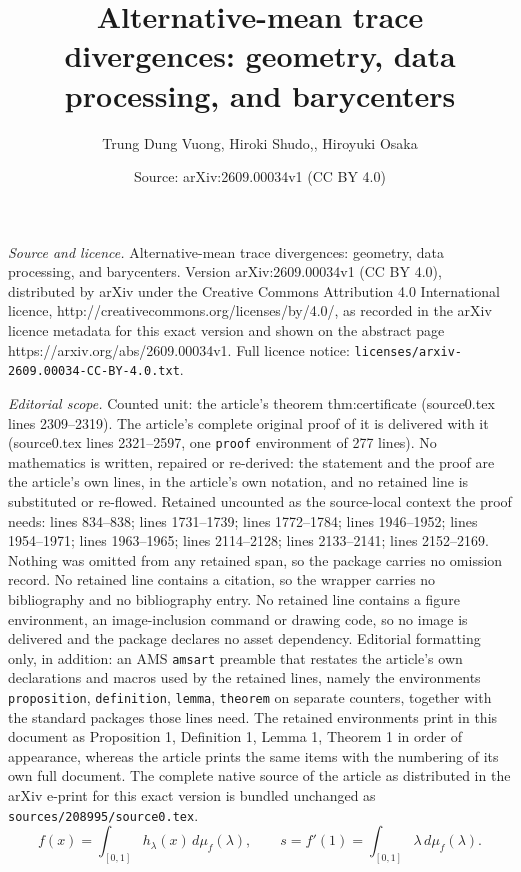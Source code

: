 \documentclass[10pt,a4paper]{amsart}
\title{Alternative-mean trace divergences: geometry, data processing, and barycenters}
\author{Trung Dung Vuong, Hiroki Shudo,, Hiroyuki Osaka}
\date{Source: arXiv:2609.00034v1 (CC BY 4.0)}
\begin{document}
\maketitle

\noindent\emph{Source and licence.} Alternative-mean trace divergences: geometry, data processing, and barycenters. Version arXiv:2609.00034v1 (CC BY 4.0), distributed by arXiv under the Creative Commons Attribution 4.0 International licence, http://creativecommons.org/licenses/by/4.0/, as recorded in the arXiv licence metadata for this exact version and shown on the abstract page https://arxiv.org/abs/2609.00034v1. Full licence notice: \texttt{licenses/arxiv-2609.00034-CC-BY-4.0.txt}.\par\smallskip

\noindent\textit{Editorial scope.} Counted unit: the article's theorem thm:certificate (source0.tex lines 2309--2319). The article's complete original proof of it is delivered with it (source0.tex lines 2321--2597, one \texttt{proof} environment of 277 lines). No mathematics is written, repaired or re-derived: the statement and the proof are the article's own lines, in the article's own notation, and no retained line is substituted or re-flowed.  Retained uncounted as the source-local context the proof needs: lines 834--838; lines 1731--1739; lines 1772--1784; lines 1946--1952; lines 1954--1971; lines 1963--1965; lines 2114--2128; lines 2133--2141; lines 2152--2169.  Nothing was omitted from any retained span, so the package carries no omission record.  No retained line contains a citation, so the wrapper carries no bibliography and no bibliography entry.  No retained line contains a figure environment, an image-inclusion command or drawing code, so no image is delivered and the package declares no asset dependency.  Editorial formatting only, in addition: an AMS \texttt{amsart} preamble that restates the article's own declarations and macros used by the retained lines, namely the environments \texttt{proposition}, \texttt{definition}, \texttt{lemma}, \texttt{theorem} on separate counters, together with the standard packages those lines need.  The retained environments print in this document as Proposition 1, Definition 1, Lemma 1, Theorem 1 in order of appearance, whereas the article prints the same items with the numbering of its own full document.  The complete native source of the article as distributed in the arXiv e-print for this exact version is bundled unchanged as \texttt{sources/208995/source0.tex}.
	\begin{equation}\label{eq:representing-measure}
		f(x)=\int_{[0,1]}h_\lambda(x)\,d\mu_f(\lambda),
		\qquad
		s=f'(1)=\int_{[0,1]}\lambda\,d\mu_f(\lambda).
	\end{equation}
\end{document}
